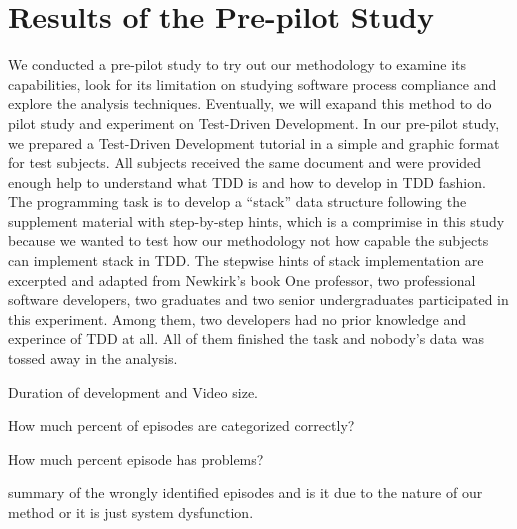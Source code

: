\section{Results of the Pre-pilot Study}

We conducted a pre-pilot study to try out our methodology to examine its
capabilities, look for its limitation on studying software process
compliance and explore the analysis techniques.  Eventually, we will
exapand this method to do pilot study and experiment on Test-Driven
Development. In our pre-pilot study, we prepared a Test-Driven Development
tutorial in a simple and graphic format for test subjects.  All subjects
received the same document and were provided enough help to understand what
TDD is and how to develop in TDD fashion. The programming task is to
develop a ``stack'' data structure following the supplement material with
step-by-step hints, which is a comprimise in this study because we wanted
to test how our methodology not how capable the subjects can implement
stack in TDD. The stepwise hints of stack implementation are excerpted and
adapted from Newkirk's book \cite{} One professor, two professional
software developers, two graduates and two senior undergraduates
participated in this experiment. Among them, two developers had no prior
knowledge and experince of TDD at all.  All of them finished the task and
nobody's data was tossed away in the analysis.

Duration of development and Video size.  

How much percent of episodes are categorized correctly?

How much percent episode has problems?  

summary of the wrongly identified episodes and is it due to the nature of
our method or it is just system dysfunction.



